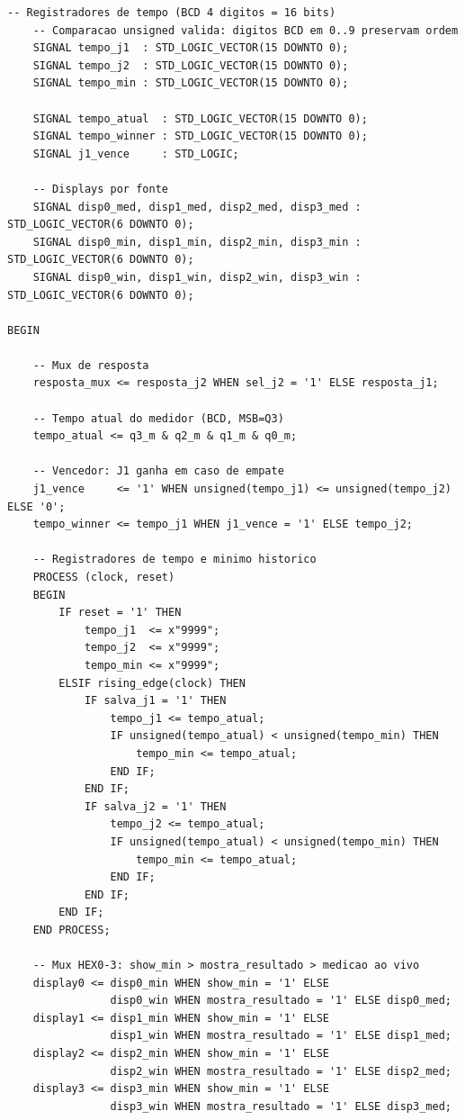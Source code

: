 \documentclass[12pt,a4paper]{article}
\begin{document}
\begin{lstlisting}[caption={Top-Level -- \texttt{jogo\_tempo\_reacao.vhd}},
                   label={lst:top}]
    -- Registradores de tempo (BCD 4 digitos = 16 bits)
    -- Comparacao unsigned valida: digitos BCD em 0..9 preservam ordem
    SIGNAL tempo_j1  : STD_LOGIC_VECTOR(15 DOWNTO 0);
    SIGNAL tempo_j2  : STD_LOGIC_VECTOR(15 DOWNTO 0);
    SIGNAL tempo_min : STD_LOGIC_VECTOR(15 DOWNTO 0);

    SIGNAL tempo_atual  : STD_LOGIC_VECTOR(15 DOWNTO 0);
    SIGNAL tempo_winner : STD_LOGIC_VECTOR(15 DOWNTO 0);
    SIGNAL j1_vence     : STD_LOGIC;

    -- Displays por fonte
    SIGNAL disp0_med, disp1_med, disp2_med, disp3_med : STD_LOGIC_VECTOR(6 DOWNTO 0);
    SIGNAL disp0_min, disp1_min, disp2_min, disp3_min : STD_LOGIC_VECTOR(6 DOWNTO 0);
    SIGNAL disp0_win, disp1_win, disp2_win, disp3_win : STD_LOGIC_VECTOR(6 DOWNTO 0);

BEGIN

    -- Mux de resposta
    resposta_mux <= resposta_j2 WHEN sel_j2 = '1' ELSE resposta_j1;

    -- Tempo atual do medidor (BCD, MSB=Q3)
    tempo_atual <= q3_m & q2_m & q1_m & q0_m;

    -- Vencedor: J1 ganha em caso de empate
    j1_vence     <= '1' WHEN unsigned(tempo_j1) <= unsigned(tempo_j2) ELSE '0';
    tempo_winner <= tempo_j1 WHEN j1_vence = '1' ELSE tempo_j2;

    -- Registradores de tempo e minimo historico
    PROCESS (clock, reset)
    BEGIN
        IF reset = '1' THEN
            tempo_j1  <= x"9999";
            tempo_j2  <= x"9999";
            tempo_min <= x"9999";
        ELSIF rising_edge(clock) THEN
            IF salva_j1 = '1' THEN
                tempo_j1 <= tempo_atual;
                IF unsigned(tempo_atual) < unsigned(tempo_min) THEN
                    tempo_min <= tempo_atual;
                END IF;
            END IF;
            IF salva_j2 = '1' THEN
                tempo_j2 <= tempo_atual;
                IF unsigned(tempo_atual) < unsigned(tempo_min) THEN
                    tempo_min <= tempo_atual;
                END IF;
            END IF;
        END IF;
    END PROCESS;

    -- Mux HEX0-3: show_min > mostra_resultado > medicao ao vivo
    display0 <= disp0_min WHEN show_min = '1' ELSE
                disp0_win WHEN mostra_resultado = '1' ELSE disp0_med;
    display1 <= disp1_min WHEN show_min = '1' ELSE
                disp1_win WHEN mostra_resultado = '1' ELSE disp1_med;
    display2 <= disp2_min WHEN show_min = '1' ELSE
                disp2_win WHEN mostra_resultado = '1' ELSE disp2_med;
    display3 <= disp3_min WHEN show_min = '1' ELSE
                disp3_win WHEN mostra_resultado = '1' ELSE disp3_med;


\end{lstlisting}
\end{document}
